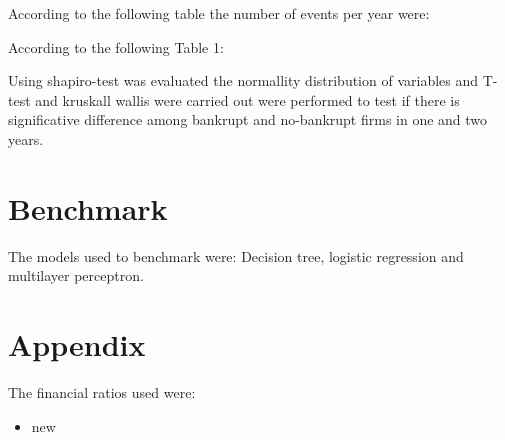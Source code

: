 \documentclass[journal]{IEEEtai}
\begin{document}
According  to the following table the number of events per year were:

According to the following Table 1:

Using shapiro-test was evaluated the normallity distribution of variables and T-test and kruskall wallis were carried out were performed to test if there is significative difference among bankrupt and no-bankrupt firms in one and two years.




\section{Benchmark}

The models used to benchmark were: Decision tree, logistic regression and multilayer perceptron.





\section{Appendix}
The financial ratios used were:

\begin{itemize}
\item new
\end{itemize}

\newpage
\printbibliography
\end{document}
